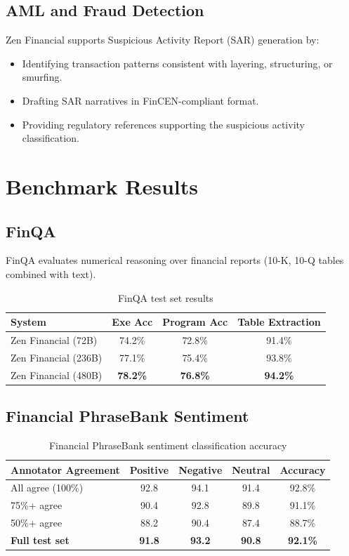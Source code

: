 \documentclass[11pt,a4paper]{article}
\begin{document}
\subsection{AML and Fraud Detection}

Zen Financial supports Suspicious Activity Report (SAR) generation by:
\begin{itemize}
  \item Identifying transaction patterns consistent with layering, structuring, or smurfing.
  \item Drafting SAR narratives in FinCEN-compliant format.
  \item Providing regulatory references supporting the suspicious activity classification.
\end{itemize}

\section{Benchmark Results}

\subsection{FinQA}

FinQA evaluates numerical reasoning over financial reports (10-K, 10-Q tables combined with text).

\begin{table}[H]
\centering
\caption{FinQA test set results}
\label{tab:finqa}
\begin{tabular}{lccc}
\toprule
System & Exe Acc & Program Acc & Table Extraction \\
\midrule
Zen Financial (72B) & 74.2\% & 72.8\% & 91.4\% \\
Zen Financial (236B) & 77.1\% & 75.4\% & 93.8\% \\
Zen Financial (480B) & \textbf{78.2\%} & \textbf{76.8\%} & \textbf{94.2\%} \\
\bottomrule
\end{tabular}
\end{table}

\subsection{Financial PhraseBank Sentiment}

\begin{table}[H]
\centering
\caption{Financial PhraseBank sentiment classification accuracy}
\label{tab:phrasebank}
\begin{tabular}{lcccc}
\toprule
Annotator Agreement & Positive & Negative & Neutral & Accuracy \\
\midrule
All agree (100\%) & 92.8 & 94.1 & 91.4 & 92.8\% \\
75\%+ agree & 90.4 & 92.8 & 89.8 & 91.1\% \\
50\%+ agree & 88.2 & 90.4 & 87.4 & 88.7\% \\
\textbf{Full test set} & \textbf{91.8} & \textbf{93.2} & \textbf{90.8} & \textbf{92.1\%} \\
\bottomrule
\end{tabular}
\end{table}
\end{document}
